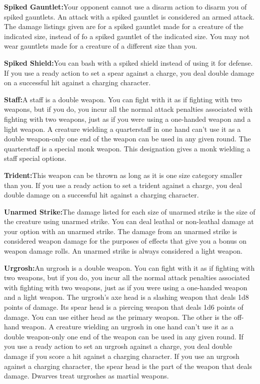 \textbf{Spiked Gauntlet:}{Your opponent cannot use a disarm action to disarm you of spiked gauntlets. An attack with a spiked gauntlet is considered an armed attack. The damage listings given are for a spiked gauntlet made for a creature of the indicated size, instead of fo a spiked gauntlet of the indicated size. You may not wear gauntlets made for a creature of a different size than you.}

\textbf{Spiked Shield:}{You can bash with a spiked shield instead of using it for defense. If you use a ready action to set a spear against a charge, you deal double damage on a successful hit against a charging character.}

\textbf{Staff:}{A staff is a double weapon. You can fight with it as if fighting with two weapons, but if you do, you incur all the normal attack penalties associated with fighting with two weapons, just as if you were using a one-handed weapon and a light weapon. A creature wielding a quarterstaff in one hand can't use it as a double weapon-only one end of the weapon can be used in any given round. The quarterstaff is a special monk weapon. This designation gives a monk wielding a staff special options.}

\textbf{Trident:}{This weapon can be thrown as long as it is one size category smaller than you. If you use a ready action to set a trident against a charge, you deal double damage on a successful hit against a charging character.}

\textbf{Unarmed Strike:}{The damage listed for each size of unarmed strike is the size of the creature using unarmed strike. You can deal leathal or non-leathal damage at your option with an unarmed strike. The damage from an unarmed strike is considered weapon damage for the purposes of effects that give you a bonus on weapon damage rolls. An unarmed strike is always considered a light weapon.}

\textbf{Urgrosh:}{An urgrosh is a double weapon. You can fight with it as if fighting with two weapons, but if you do, you incur all the normal attack penalties associated with fighting with two weapons, just as if you were using a one-handed weapon and a light weapon. The urgrosh's axe head is a slashing weapon that deals 1d8 points of damage. Its spear head is a piercing weapon that deals 1d6 points of damage. You can use either head as the primary weapon. The other is the off-hand weapon. A creature wielding an urgrosh in one hand can't use it as a double weapon-only one end of the weapon can be used in any given round. If you use a ready action to set an urgrosh against a charge, you deal double damage if you score a hit against a charging character. If you use an urgrosh against a charging character, the spear head is the part of the weapon that deals damage. Dwarves treat urgroshes as martial weapons.}

